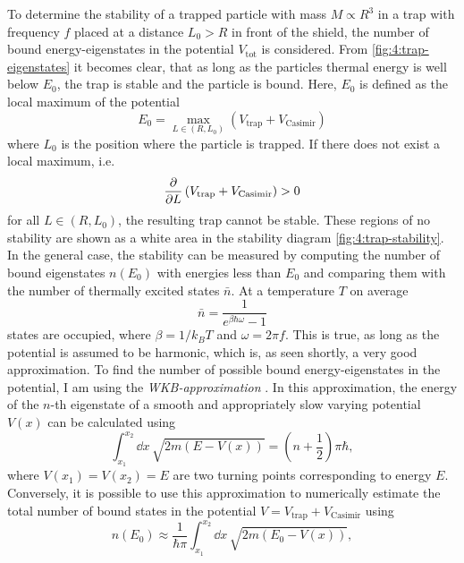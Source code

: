 To determine the stability of a trapped particle with mass $M \propto R^3$ in a trap with frequency $f$ placed at a distance $L_0 > R$ in front of the shield, the number of bound energy-eigenstates in the potential $V_\mathrm{tot}$ is considered.
From \cref{fig:4:trap-eigenstates} it becomes clear, that as long as the particles thermal energy is well below $E_0$, the trap is stable and the particle is bound.
Here, $E_0$ is defined as the local maximum of the potential 
\begin{equation}
  E_0 = \max_{L\in(R,L_0)} \left( V_\mathrm{trap} + V_\mathrm{Casimir} \right)
\end{equation}
where $L_0$ is the position where the particle is trapped.
If there does not exist a local maximum, i.e.
\begin{equation}
  \pdv{L} \left( V_\mathrm{trap} + V_\mathrm{Casimir} \right) > 0
\end{equation}
for all $L \in (R, L_0)$, the resulting trap cannot be stable. These regions of no stability are shown as a white area in the stability diagram \cref{fig:4:trap-stability}.
In the general case, the stability can be measured by computing the number of bound eigenstates $n(E_0)$ with energies less than $E_0$ and comparing them with the number of thermally excited states $\bar{n}$.
At a temperature $T$ on average 
\begin{equation}
  \bar{n} = \frac{1}{e^{\beta \hbar \omega} - 1}
\end{equation}
states are occupied, where $\beta = 1/k_B T$ and $\omega = 2\pi f$. This is true, as long as the potential is assumed to be harmonic, which is, as seen shortly, a very good approximation.
To find the number of possible bound energy-eigenstates in the potential, I am using the \emph{WKB-approximation} \cite{Schleich_2001}.
In this approximation, the energy of the $n$-th eigenstate of a smooth and appropriately slow varying potential $V(x)$ can be calculated using \cite[p. 163]{Schleich_2001}
\begin{equation}
  \int_{x_1}^{x_2} \dd x \, \sqrt{2m(E-V(x))} = \left(n + \frac{1}{2}\right)\pi\hbar ,
\end{equation}
where $V(x_1) = V(x_2) = E$ are two turning points corresponding to energy $E$.
Conversely, it is possible to use this approximation to numerically estimate the total number of bound states in the potential $V = V_\mathrm{trap} + V_\mathrm{Casimir}$ using
\begin{equation}
  n(E_0) \approx \frac{1}{\hbar \pi} \int_{x_1}^{x_2} \dd x \, \sqrt{2m(E_0 - V(x))},
\end{equation}
